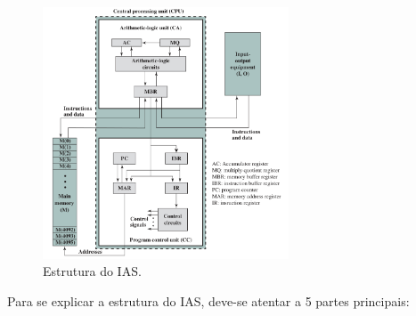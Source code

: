 \documentclass{article}
\begin{document}
\begin{figure}[h]
    \centering
    \includegraphics[width=0.65\textwidth]{ias.png}
    \caption{Estrutura do IAS.}
\end{figure}

Para se explicar a estrutura do IAS, deve-se atentar a 5 partes principais:
\end{document}
